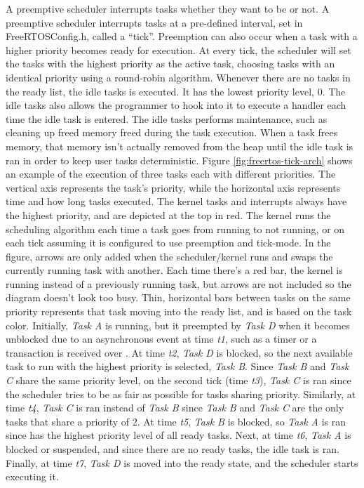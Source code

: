 A preemptive scheduler interrupts tasks whether they want to be or not. A
preemptive scheduler interrupts tasks at a pre-defined interval, set in
FreeRTOSConfig.h, called a ``tick''. Preemption can also occur when a task with
a higher priority becomes ready for execution. At every tick, the scheduler will
set the tasks with the highest priority as the active task, choosing tasks with
an identical priority using a round-robin algorithm. Whenever there are no tasks
in the ready list, the idle tasks is executed. It has the lowest priority
level, 0. The idle tasks also allows the programmer to hook into it to execute a
handler each time the idle task is entered. The idle tasks performs maintenance,
such as cleaning up freed memory freed during the task execution. When a task
frees memory, that memory isn't actually removed from the heap until the idle
task is ran in order to keep user tasks deterministic. Figure
\ref{fig:freertos-tick-arch} shows an example of the execution of three tasks
each with different priorities. The vertical axis represents the task's
priority, while the horizontal axis represents time and how long tasks executed.
The kernel tasks and interrupts always have the highest priority, and are
depicted at the top in red. The kernel runs the scheduling algorithm each time a
task goes from running to not running, or on each tick assuming it is configured
to use preemption and tick-mode. In the figure, arrows are only added when the
scheduler/kernel runs and swaps the currently running task with another. Each
time there's a red bar, the kernel is running instead of a previously running
task, but arrows are not included so the diagram doesn't look too busy. Thin,
horizontal bars between tasks on the same priority represents that task moving
into the ready list, and is based on the task color. Initially, \emph{Task A}
is running, but it preempted by \emph{Task D} when it becomes unblocked due to
an asynchronous event at time \emph{t1}, such as a timer or a transaction is
received over \iic. At time \emph{t2}, \emph{Task D} is blocked, so the next
available task to run with the highest priority is selected, \emph{Task B}.
Since \emph{Task B} and \emph{Task C} share the same priority level, on the
second tick (time \emph{t3}), \emph{Task C} is ran since the scheduler tries to
be as fair as possible for tasks sharing priority.  Similarly, at time
\emph{t4}, \emph{Task C} is ran instead of \emph{Task B} since \emph{Task B} and
\emph{Task C} are the only tasks that share a priority of 2. At time \emph{t5},
\emph{Task B} is blocked, so \emph{Task A} is ran since has the highest priority
level of all ready tasks.  Next, at time \emph{t6}, \emph{Task A} is blocked or
suspended, and since there are no ready tasks, the idle task is ran. Finally, at
time \emph{t7}, \emph{Task D} is moved into the ready state, and the scheduler
starts executing it.

